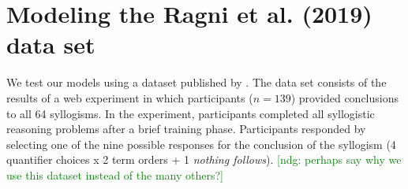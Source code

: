 \documentclass[floatsintext, doc]{apa6}
\newcommand{\ndg}[1]{{\textcolor{Green}{[ndg: #1]}}}
\begin{document}

%





\section{Modeling the Ragni et al. (2019) data set}

We test our models using a dataset published by . 
The data set consists of the results of a web experiment in which participants ($n = 139$) provided conclusions to all 64 syllogisms. In the experiment, participants completed all syllogistic reasoning problems after a brief training phase. Participants responded by selecting one of the nine possible responses for the conclusion of the syllogism (4 quantifier choices x 2 term orders + 1 \emph{nothing follows}). \ndg{perhaps say why we use this dataset instead of the many others?}


%
\end{document}

